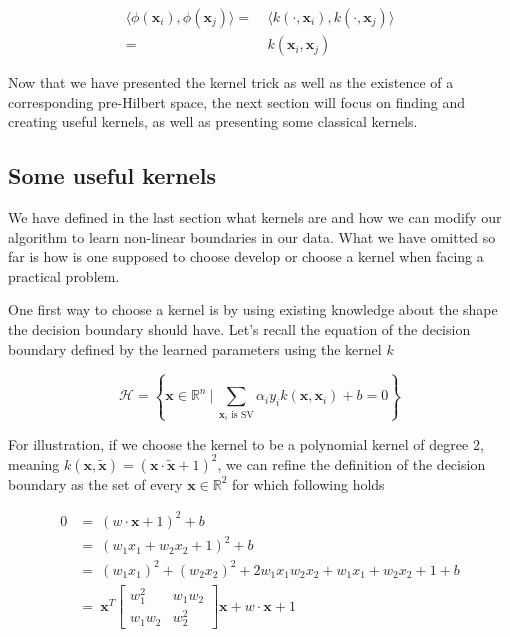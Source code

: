 \begin{equation*}
  \begin{aligned}
    \langle \phi(\mathbf{x}_i), \phi(\mathbf{x}_j)\rangle =\ &\langle k\left(\cdot, \mathbf{x}_i\right), k\left(\cdot, \mathbf{x}_j\right)\rangle \\
    =\ &k(\mathbf{x}_i, \mathbf{x}_j)
  \end{aligned}
\end{equation*}

Now that we have presented the kernel trick as well as the existence of a corresponding pre-Hilbert space, the next section will focus on finding and creating useful kernels, as well as presenting some classical kernels.

\subsection {Some useful kernels}

We have defined in the last section what kernels are and how we can modify our algorithm to learn non-linear boundaries in our data. What we have omitted so far is how is one supposed to choose develop or choose a kernel when facing a practical problem.

One first way to choose a kernel is by using existing knowledge about the shape the decision boundary should have. Let's recall the equation of the decision boundary defined by the learned parameters using the kernel $k$

\begin{equation*}
  \mathscr{H} = \left\{\mathbf{x} \in \mathbb{R}^n\ |\ \sum_{\mathbf{x}_i \text{ is SV}}\alpha_iy_ik\left(\mathbf{x}, \mathbf{x}_i\right) + b = 0\right\}
\end{equation*}

For illustration, if we choose the kernel to be a polynomial kernel of degree $2$, meaning $k\left(\mathbf{x}, \mathbf{\tilde{x}}\right) = \left(\mathbf{x} \cdot \mathbf{\tilde{x}} + 1\right)^2$, we can refine the definition of the decision boundary as the set of every $\mathbf{x} \in \mathbb{R}^2$ for which following holds

\begin{equation*}
  \begin{aligned}
    0 &=\ \left(w \cdot \mathbf{x} + 1\right)^2 + b\\
      &=\ \left(w_1x_1 + w_2x_2 + 1\right)^2 + b\\
      &=\ (w_1x_1)^2 + (w_2x_2)^2 + 2w_1x_1w_2x_2 + w_1x_1 + w_2x_2 + 1 + b\\
      &=\ \mathbf{x}^T\begin{bmatrix}w_1^2 & w_1w_2\\ w_1w_2 & w_2^2\end{bmatrix}\mathbf{x} + w \cdot \mathbf{x} + 1 
  \end{aligned}
\end{equation*}

